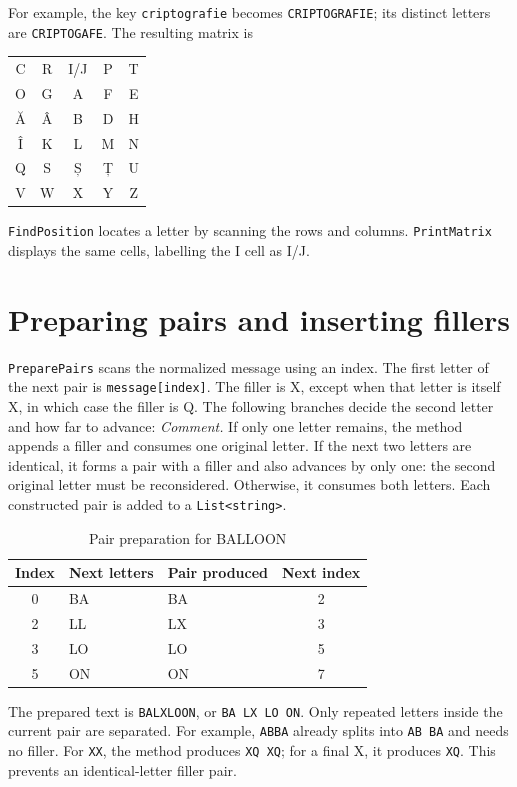 \documentclass{tum_report}
\newcommand{\codepart}[2]{{\setstretch{1}}}
\begin{document}
For example, the key \texttt{criptografie} becomes
\texttt{CRIPTOGRAFIE}; its distinct letters are \texttt{CRIPTOGAFE}.
The resulting matrix is
\begin{center}
\begin{tabular}{ccccc}\toprule
C & R & I/J & P & T\\
O & G & A & F & E\\
Ă & Â & B & D & H\\
Î & K & L & M & N\\
Q & S & Ș & Ț & U\\
V & W & X & Y & Z\\\bottomrule
\end{tabular}\end{center}
\texttt{FindPosition} locates a letter by scanning the rows and columns.
\texttt{PrintMatrix} displays the same cells, labelling the I cell as I/J.

\clearpage
\section{Preparing pairs and inserting fillers}
\texttt{PreparePairs} scans the normalized message using an index. The
first letter of the next pair is \texttt{message[index]}. The filler is
X, except when that letter is itself X, in which case the filler is Q.
The following branches decide the second letter and how far to advance:
\codepart{172}{190}
\noindent\textit{Comment.} If only one letter remains, the method appends
a filler and consumes one original letter. If the next two letters are
identical, it forms a pair with a filler and also advances by only one:
the second original letter must be reconsidered. Otherwise, it consumes
both letters. Each constructed pair is added to a \texttt{List<string>}.

\begin{table}[H]\caption{Pair preparation for BALLOON}
\centering
\begin{tabular}{cllc}\toprule
Index & Next letters & Pair produced & Next index\\\midrule
0 & BA & BA & 2\\
2 & LL & LX & 3\\
3 & LO & LO & 5\\
5 & ON & ON & 7\\\bottomrule
\end{tabular}\end{table}
The prepared text is \texttt{BALXLOON}, or \texttt{BA LX LO ON}.
Only repeated letters inside the current pair are separated. For example,
\texttt{ABBA} already splits into \texttt{AB BA} and needs no filler.
For \texttt{XX}, the method produces \texttt{XQ XQ}; for a final X, it
produces \texttt{XQ}. This prevents an identical-letter filler pair.
\end{document}
